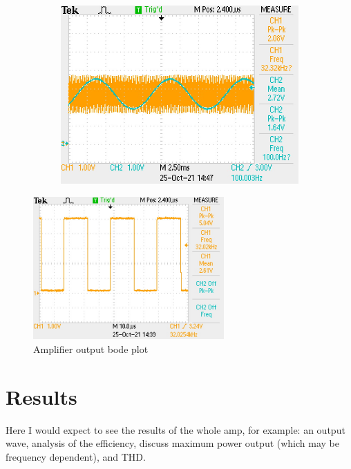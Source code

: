 \documentclass[a4paper,11pt]{article}
\begin{document}
\begin{figure}[h!]
\begin{subfigure}{0.48\textwidth}
        \includegraphics[width=\columnwidth]{spwm/input_sampling_0.JPG}
    \end{subfigure}
    \caption{}
\end{figure}

\begin{figure}[h!]
    \centering
    \includegraphics[width=0.65\textwidth]{spwm/spwm_no_input.JPG}
    \caption{Amplifier output bode plot}
\end{figure}


\section{Results}

Here I would expect to see the results of the whole amp, for example: an output wave, analysis of the efficiency, discuss maximum power output (which may be frequency dependent), and THD.
\end{document}
